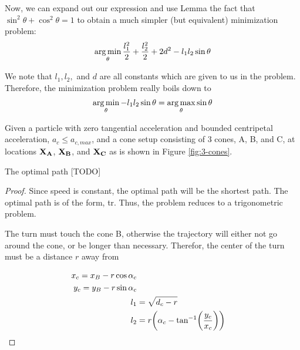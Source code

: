 Now, we can expand out our expression and use Lemma the fact that $\sin^2 \theta + \cos^2 \theta = 1$ to obtain a much simpler (but equivalent) minimization problem:
\begin{eqnarray}
  \operatorname*{arg\,min}_{\theta} \frac{l_1^2}{2} + \frac{l_2^2}{2} + 2d^2 - l_1 l_2 \sin \theta
\end{eqnarray}

We note that $l_1, l_2,$ and $d$ are all constants which are given to us in the problem. Therefore, the minimization problem really boils down to
\begin{eqnarray}
  \operatorname*{arg\,min}_{\theta} - l_1 l_2 \sin \theta = \operatorname*{arg\,max}_{\theta} \sin \theta
\end{eqnarray}


\begin{theorem}

Given a particle with zero tangential acceleration and bounded centripetal acceleration, $a_c \le a_{c,max}$, and a cone setup consisting of 3 cones, A, B, and C, at locations $\mathbf{X_A}$, $\mathbf{X_B}$, and $\mathbf{X_C}$ as is shown in Figure \ref{fig:3-cones}.


The optimal path [TODO]

\end{theorem}

\begin{proof}
Since speed is constant, the optimal path will be the shortest path. The optimal path is of the form, tr. Thus, the problem reduces to a trigonometric problem.


The turn must touch the cone B, otherwise the trajectory will either not go around the cone, or be longer than necessary. Therefor, the center of the turn must be a distance $r$ away from 


\begin{align*}
x_c = x_B - r \cos{\alpha_c}\\
y_c = y_B - r \sin{\alpha_c}\\
l_1& = \sqrt{d_c - r}\\
l_2& = r \paren{\alpha_c - \tan^{-1}\paren{\frac{y_c}{x_c}}}\\
\end{align*}
\end{proof}